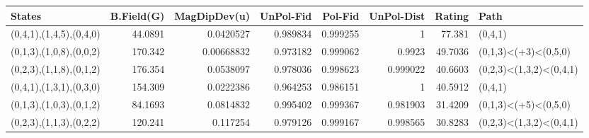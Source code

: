 \begin{tabular}{lrrrrrrl}
\hline
 States                  &   B.Field(G) &   MagDipDev(u) &   UnPol-Fid &   Pol-Fid &   UnPol-Dist &   Rating & Path                    \\
\hline
 (0,4,1),(1,4,5),(0,4,0) &      44.0891 &     0.0420527  &    0.989834 &  0.999255 &     1        &  77.381  & (0,4,1)                 \\
 (0,1,3),(1,0,8),(0,0,2) &     170.342  &     0.00668832 &    0.973182 &  0.999062 &     0.9923   &  49.7036 & (0,1,3)<(+3)<(0,5,0)    \\
 (0,2,3),(1,1,8),(0,1,2) &     176.354  &     0.0538097  &    0.978036 &  0.998623 &     0.999022 &  40.6603 & (0,2,3)<(1,3,2)<(0,4,1) \\
 (0,4,1),(1,3,1),(0,3,0) &     154.309  &     0.0222386  &    0.964253 &  0.986151 &     1        &  40.5912 & (0,4,1)                 \\
 (0,1,3),(1,0,3),(0,1,2) &      84.1693 &     0.0814832  &    0.995402 &  0.999367 &     0.981903 &  31.4209 & (0,1,3)<(+5)<(0,5,0)    \\
 (0,2,3),(1,1,3),(0,2,2) &     120.241  &     0.117254   &    0.979126 &  0.999167 &     0.998565 &  30.8283 & (0,2,3)<(1,3,2)<(0,4,1) \\
\hline
\end{tabular}